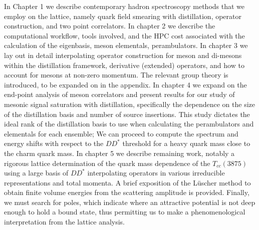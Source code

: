 In Chapter 1 we describe contemporary hadron spectroscopy methods that we employ on the lattice,  namely quark field smearing with distillation, operator construction, and two point correlators. In chapter 2 we describe the computational workflow, tools involved, and the HPC cost associated with the calculation of the eigenbasis, meson elementals, perambulators. In chapter 3 we lay out in detail interpolating operator construction for meson and di-mesons within the distillation framework, derivative (extended) operators, and how to account for mesons at non-zero momentum. The relevant group theory is introduced, to be expanded on in the appendix. In chapter 4 we expand on the end-point analysis of meson correlators and present results for our study of mesonic signal saturation with distillation, specifically the dependence on the size of the distillation basis and number of source insertions. This study dictates the ideal rank of the distillation basis to use when calculating the perambulators and elementals for each ensemble; We can proceed to compute the spectrum and energy shifts with respect to the $DD^*$ threshold for a heavy quark mass close to the charm quark mass.  In chapter 5 we describe remaining work, notably a rigorous lattice determination of the quark mass dependence of the $T_{cc}(3875)$ using a large basis of $DD^*$ interpolating operators in various irreducible representations and total momenta. A brief exposition of the L\"{u}scher method to obtain finite volume energies from the scattering amplitude is provided. Finally, we must search for poles, which indicate where an attractive potential is not deep enough to hold a bound state, thus permitting us to make a phenomenological interpretation from the lattice analysis. 